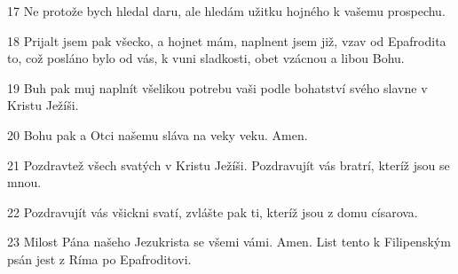 \par 17 Ne protože bych hledal daru, ale hledám užitku hojného k vašemu prospechu.
\par 18 Prijalt jsem pak všecko, a hojnet mám, naplnent jsem již, vzav od Epafrodita to, což posláno bylo od vás, k vuni sladkosti, obet vzácnou a libou Bohu.
\par 19 Buh pak muj naplnít všelikou potrebu vaši podle bohatství svého slavne v Kristu Ježíši.
\par 20 Bohu pak a Otci našemu sláva na veky veku. Amen.
\par 21 Pozdravtež všech svatých v Kristu Ježíši. Pozdravujít vás bratrí, kteríž jsou se mnou.
\par 22 Pozdravujít vás všickni svatí, zvlášte pak ti, kteríž jsou z domu císarova.
\par 23 Milost Pána našeho Jezukrista se všemi vámi. Amen. List tento k Filipenským psán jest z Ríma po Epafroditovi.


